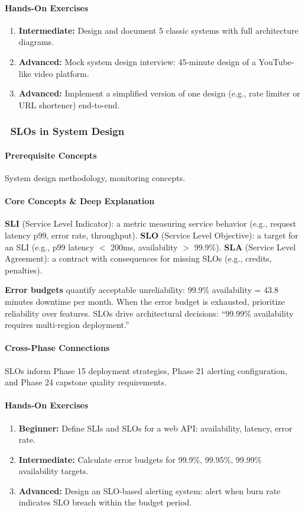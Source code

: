 \documentclass[11pt, a4paper, oneside]{report}
\newcommand{\mustmaster}[1]{\subsubsection{\texorpdfstring{\fcolorbox{blue!40!black}{blue!8}{\footnotesize\bfseries\color{blue!40!black} MUST MASTER}~#1}{#1}}}
\begin{document}
\paragraph{Hands-On Exercises}
\begin{enumerate}[leftmargin=*]
\item \textbf{Intermediate:} Design and document 5 classic systems with full architecture diagrams.
\item \textbf{Advanced:} Mock system design interview: 45-minute design of a YouTube-like video platform.
\item \textbf{Advanced:} Implement a simplified version of one design (e.g., rate limiter or URL shortener) end-to-end.
\end{enumerate}

\mustmaster{SLOs in System Design}

\paragraph{Prerequisite Concepts} System design methodology, monitoring concepts.

\paragraph{Core Concepts \& Deep Explanation} \textbf{SLI} (Service Level Indicator): a metric measuring service behavior (e.g., request latency p99, error rate, throughput). \textbf{SLO} (Service Level Objective): a target for an SLI (e.g., p99 latency $<$ 200ms, availability $>$ 99.9\%). \textbf{SLA} (Service Level Agreement): a contract with consequences for missing SLOs (e.g., credits, penalties).

\textbf{Error budgets} quantify acceptable unreliability: 99.9\% availability = 43.8 minutes downtime per month. When the error budget is exhausted, prioritize reliability over features. SLOs drive architectural decisions: ``99.99\% availability requires multi-region deployment.''

\paragraph{Cross-Phase Connections} SLOs inform Phase 15 deployment strategies, Phase 21 alerting configuration, and Phase 24 capstone quality requirements.

\paragraph{Hands-On Exercises}
\begin{enumerate}[leftmargin=*]
\item \textbf{Beginner:} Define SLIs and SLOs for a web API: availability, latency, error rate.
\item \textbf{Intermediate:} Calculate error budgets for 99.9\%, 99.95\%, 99.99\% availability targets.
\item \textbf{Advanced:} Design an SLO-based alerting system: alert when burn rate indicates SLO breach within the budget period.
\end{enumerate}
\end{document}
